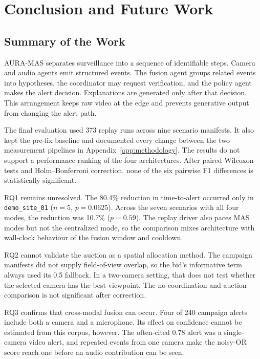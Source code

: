 \chapter{Conclusion and Future Work}
\label{chap:conclusion}

\section{Summary of the Work}

AURA-MAS separates surveillance into a sequence of identifiable steps. Camera
and audio agents emit structured events. The fusion agent groups related events
into hypotheses, the coordinator may request verification, and the policy agent
makes the alert decision. Explanations are generated only after that decision.
This arrangement keeps raw video at the edge and prevents generative output
from changing the alert path.

The final evaluation used 373 replay runs across nine scenario manifests. It
also kept the pre-fix baseline and documented every change between the two
measurement pipelines in Appendix~\ref{app:methodology}. The results do not
support a performance ranking of the four architectures. After paired Wilcoxon
tests and Holm--Bonferroni correction, none of the six pairwise F1 differences
is statistically significant.

RQ1 remains unresolved. The 80.4\% reduction in time-to-alert occurred only
in \texttt{demo\_site\_01} ($n=5$, $p=0.0625$). Across the seven scenarios
with all four modes, the reduction was 10.7\% ($p=0.59$). The replay driver
also paces MAS modes but not the centralized mode, so the comparison mixes
architecture with wall-clock behaviour of the fusion window and cooldown.

RQ2 cannot validate the auction as a spatial allocation method. The campaign
manifests did not supply field-of-view overlap, so the bid's informative term
always used its 0.5 fallback. In a two-camera setting, that does not test
whether the selected camera has the best viewpoint. The no-coordination and
auction comparison is not significant after correction.

RQ3 confirms that cross-modal fusion can occur. Four of 240 campaign alerts
include both a camera and a microphone. Its effect on confidence cannot be
estimated from this corpus, however. The often-cited 0.78 alert was a
single-camera video alert, and repeated events from one camera make the
noisy-OR score reach one before an audio contribution can be seen.

